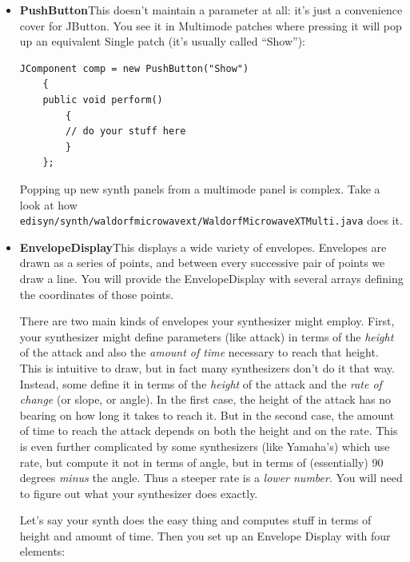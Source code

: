 \documentclass{article}
\begin{document}
\begin{itemize}
\item {\bf PushButton}\quad This doesn't maintain a parameter at all: it's just a convenience cover for JButton.  You see it in Multimode patches where pressing it will pop up an equivalent Single patch (it's usually called ``Show''):

\begin{verbatim}
JComponent comp = new PushButton("Show")
    {
    public void perform()
        {
        // do your stuff here
        }
    };
\end{verbatim}

Popping up new synth panels from a multimode panel is complex.  Take a look at how {\tt edisyn/synth/waldorfmicrowavext/WaldorfMicrowaveXTMulti.java} does it.

\item {\bf EnvelopeDisplay}\quad This displays a wide variety of envelopes.  Envelopes are drawn as a series of points, and between every successive pair of points we draw a line.    You will provide the EnvelopeDisplay with several arrays defining the coordinates of those points.  

There are two main kinds of envelopes your synthesizer might employ.  First, your synthesizer might define parameters (like attack) in terms of the {\it height} of the attack and also the {\it amount of time} necessary to reach that height.  This is intuitive to draw, but in fact many synthesizers don't do it that way.  Instead, some define it in terms of the {\it height} of the attack and the {\it rate of change} (or slope, or angle).  In the first case, the height of the attack has no bearing on how long it takes to reach it.  But in the second case, the amount of time to reach the attack depends on both the height and on the rate.  This is even further complicated by some synthesizers (like Yamaha's) which use rate, but compute it not in terms of angle, but in terms of (essentially) 90 degrees {\it minus} the angle.  Thus a steeper rate is a {\it lower number}.  You will need to figure out what your synthesizer does exactly.  

Let's say your synth does the easy thing and computes stuff in terms of height and amount of time.  Then you set up an Envelope Display with four elements:


\end{itemize}
\end{document}
